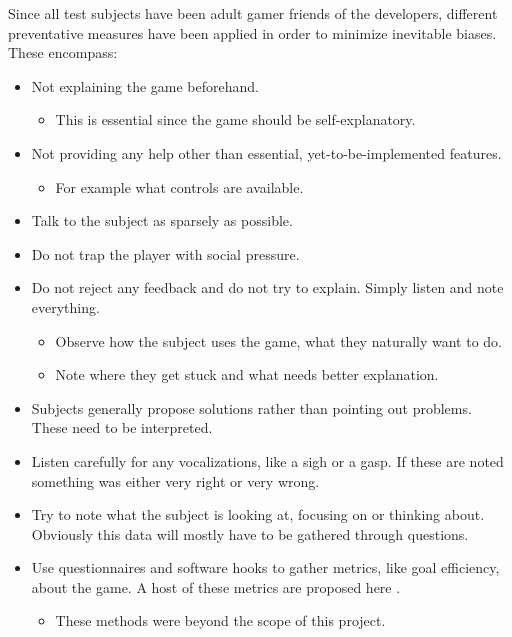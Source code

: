 Since all test subjects have been adult gamer friends of the
developers, different preventative measures have been applied in order
to minimize inevitable biases. These encompass:

\begin{itemize}
\item Not explaining the game beforehand.
\begin{itemize}
\item This is essential since the game should be self-explanatory.
\end{itemize}

\item Not providing any help other than essential, yet-to-be-implemented features.
\begin{itemize}
\item For example what controls are available.
\end{itemize}

\item Talk to the subject as sparsely as possible.
\item Do not trap the player with social pressure.
\item Do not reject any feedback and do not try to explain. Simply
  listen and note everything.
\begin{itemize}
\item Observe how the subject uses the game, what they naturally want
  to do.
\item Note where they get stuck and what needs better explanation.
\end{itemize}


\item Subjects generally propose solutions rather than pointing out
  problems. These need to be interpreted.
\item Listen carefully for any vocalizations, like a sigh or a
  gasp. If these are noted something was either very right or very
  wrong.
\item Try to note what the subject is looking at, focusing on or
  thinking about. Obviously this data will mostly have to be gathered
  through questions.
\item Use questionnaires and software hooks to gather metrics, like
  goal efficiency, about the game. A host of these metrics are
  proposed here \cite{sanchez09}.
\begin{itemize}
\item These methods were beyond the scope of this project.
\end{itemize}

\end{itemize}


